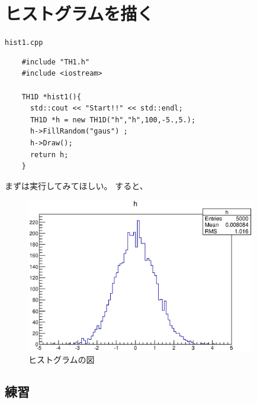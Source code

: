 \clearpage
 \section{ヒストグラムを描く}

 \begin{itembox}{\texttt{hist1.cpp}}
\begin{verbatim}
	#include "TH1.h"
	#include <iostream>

	TH1D *hist1(){
	  std::cout << "Start!!" << std::endl;
	  TH1D *h = new TH1D("h","h",100,-5.,5.);
	  h->FillRandom("gaus") ;
	  h->Draw();
	  return h;
	}
\end{verbatim}
 \end{itembox}

 まずは実行してみてほしい。
 すると、
 \begin{figure}[htbp]
  \begin{center}
   \includegraphics[width = 100mm]{./picture/hist1canvas1.eps}
  \end{center}
  \caption{ヒストグラムの図}
  \label{Fig:hist1canvas1}
 \end{figure}

  \subsection{練習}

